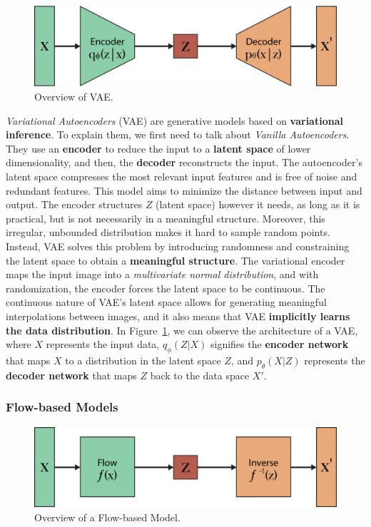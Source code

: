\documentclass[preprint]{elsarticle}
\begin{document}
\begin{figure}[t]
	\centering
    \includegraphics[scale=0.8]{img/svg/VAE.png}
    \caption{Overview of VAE.}\label{fig:vae}
\end{figure}

\emph{Variational Autoencoders} (VAE) \cite{kingma2022autoencoding} are generative models based on \textbf{variational inference}.
To explain them, we first need to talk about \emph{Vanilla Autoencoders}.
They use an \textbf{encoder} to reduce the input to a \textbf{latent space} of lower dimensionality, and then, the \textbf{decoder} reconstructs the input. 
The autoencoder's latent space compresses the most relevant input features and is free of noise and redundant features.
This model aims to minimize the distance between input and output. The encoder structures $Z$ (latent space) however it needs, as long as it is practical, but is not necessarily in a meaningful structure. 
Moreover, this irregular, unbounded distribution makes it hard to sample random points.
Instead, VAE solves this problem by introducing randomness and constraining the latent space to obtain a \textbf{meaningful structure}. 
The variational encoder maps the input image into a \emph{multivariate normal distribution}, and with randomization, the encoder forces the latent space to be continuous. 
The continuous nature of VAE's latent space allows for generating meaningful interpolations between images, and it also means that VAE \textbf{implicitly learns the data distribution}. In Figure~\ref{fig:vae}, we can observe the architecture of a VAE, where $X$ represents the input data, $q_\phi(Z|X)$ signifies the \textbf{encoder network} that maps $X$ to a distribution in the latent space $Z$, and $p_\theta(X|Z)$ represents the \textbf{decoder network} that maps $Z$ back to the data space $X'$.

\subsubsection{Flow-based Models} \label{sec:flow}
\begin{figure}[b]
	\centering
    \includegraphics[scale=0.8]{img/svg/FB.png}
    \caption{Overview of a Flow-based Model.}\label{fig:flow}
\end{figure}
\end{document}
